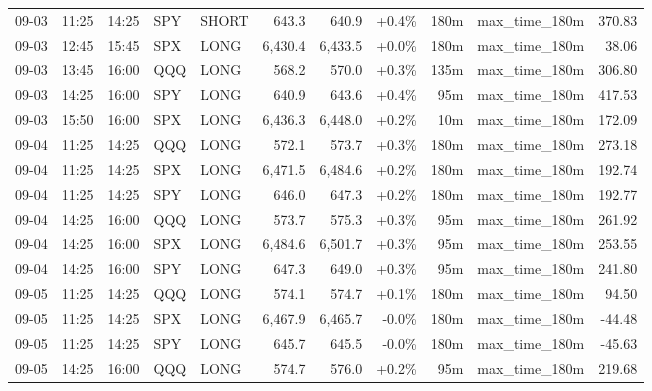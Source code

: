 \documentclass[11pt,a4paper,twoside]{article}
\begin{document}
\begin{center}
\begin{longtable}{>{\color{txtmain}}l l l l l r r r r >{\color{txtmain}}l r}
09-03 & 11:25 & 14:25 & SPY & SHORT & 643.3 & 640.9 & \textcolor{wingreen}{+0.4\%} & 180m & max\_time\_180m & \textcolor{wingreen}{370.83} \\
09-03 & 12:45 & 15:45 & SPX & LONG & 6,430.4 & 6,433.5 & \textcolor{wingreen}{+0.0\%} & 180m & max\_time\_180m & \textcolor{wingreen}{38.06} \\
09-03 & 13:45 & 16:00 & QQQ & LONG & 568.2 & 570.0 & \textcolor{wingreen}{+0.3\%} & 135m & max\_time\_180m & \textcolor{wingreen}{306.80} \\
09-03 & 14:25 & 16:00 & SPY & LONG & 640.9 & 643.6 & \textcolor{wingreen}{+0.4\%} & 95m & max\_time\_180m & \textcolor{wingreen}{417.53} \\
09-03 & 15:50 & 16:00 & SPX & LONG & 6,436.3 & 6,448.0 & \textcolor{wingreen}{+0.2\%} & 10m & max\_time\_180m & \textcolor{wingreen}{172.09} \\
09-04 & 11:25 & 14:25 & QQQ & LONG & 572.1 & 573.7 & \textcolor{wingreen}{+0.3\%} & 180m & max\_time\_180m & \textcolor{wingreen}{273.18} \\
09-04 & 11:25 & 14:25 & SPX & LONG & 6,471.5 & 6,484.6 & \textcolor{wingreen}{+0.2\%} & 180m & max\_time\_180m & \textcolor{wingreen}{192.74} \\
09-04 & 11:25 & 14:25 & SPY & LONG & 646.0 & 647.3 & \textcolor{wingreen}{+0.2\%} & 180m & max\_time\_180m & \textcolor{wingreen}{192.77} \\
09-04 & 14:25 & 16:00 & QQQ & LONG & 573.7 & 575.3 & \textcolor{wingreen}{+0.3\%} & 95m & max\_time\_180m & \textcolor{wingreen}{261.92} \\
09-04 & 14:25 & 16:00 & SPX & LONG & 6,484.6 & 6,501.7 & \textcolor{wingreen}{+0.3\%} & 95m & max\_time\_180m & \textcolor{wingreen}{253.55} \\
09-04 & 14:25 & 16:00 & SPY & LONG & 647.3 & 649.0 & \textcolor{wingreen}{+0.3\%} & 95m & max\_time\_180m & \textcolor{wingreen}{241.80} \\
09-05 & 11:25 & 14:25 & QQQ & LONG & 574.1 & 574.7 & \textcolor{wingreen}{+0.1\%} & 180m & max\_time\_180m & \textcolor{wingreen}{94.50} \\
09-05 & 11:25 & 14:25 & SPX & LONG & 6,467.9 & 6,465.7 & \textcolor{lossred}{-0.0\%} & 180m & max\_time\_180m & \textcolor{lossred}{-44.48} \\
09-05 & 11:25 & 14:25 & SPY & LONG & 645.7 & 645.5 & \textcolor{lossred}{-0.0\%} & 180m & max\_time\_180m & \textcolor{lossred}{-45.63} \\
09-05 & 14:25 & 16:00 & QQQ & LONG & 574.7 & 576.0 & \textcolor{wingreen}{+0.2\%} & 95m & max\_time\_180m & \textcolor{wingreen}{219.68} \\

\end{longtable}
\end{center}
\end{document}
